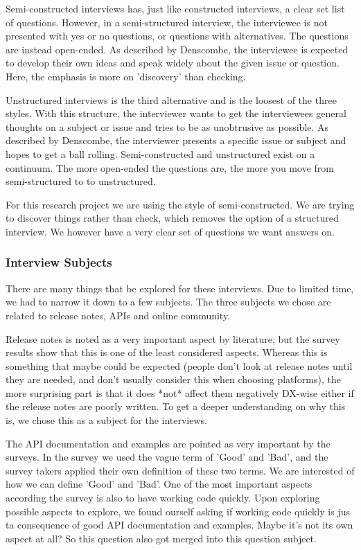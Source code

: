 \documentclass{article}
\begin{document}
Semi-constructed interviews has, just like constructed interviews, a clear set
list of questions. However, in a semi-structured interview, the interviewee
is not presented with yes or no questions, or questions with alternatives.
The questions are instead open-ended. As described by Denscombe, the interviewee
is expected to develop their own ideas and speak widely about the given issue or question.
Here, the emphasis is more on 'discovery' than checking.

Unstructured interviews is the third alternative and is the loosest of the three styles.
With this structure, the interviewer wants to get the interviewees general thoughts
on a subject or issue and tries to be as unobtrusive as possible. As described by Denscombe,
the interviewer presents a specific issue or subject and hopes to get a ball rolling.
Semi-constructed and unstructured exist on a continuum. The more open-ended the questions
are, the more you move from semi-structured to to unstructured.

For this research project we are using the style of semi-constructed.
We are trying to discover things rather than check, which removes the option
of a structured interview. We however have a very clear set of questions
we want answers on.

\subsubsection{Interview Subjects}
There are many things that be explored for these interviews. Due to limited
time, we had to narrow it down to a few subjects. The three subjects
we chose are related to release notes, APIs and online community.

Release notes is noted as a very important aspect by literature, but
the survey results show that this is one of the least considered aspects.
Whereas this is something that maybe could be expected (people don't look
at release notes until they are needed, and don't usually consider this
when choosing platforms), the more surprising part is that it does *not*
affect them negatively DX-wise either if the release notes are poorly written.
To get a deeper understanding on why this is, we chose this as a subject
for the interviews.

The API documentation and examples are pointed as very important by the
surveys. In the survey we used the vague term of 'Good' and 'Bad', and
the survey takers applied their own definition of these two terms. We
are interested of how we can define 'Good' and 'Bad'. One of the most important
aspects according the survey is also to have working code quickly. Upon exploring
possible aspects to explore, we found ourself asking if working code quickly
is jus ta consequence of good API documentation and examples. Maybe it's not
its own aspect at all? So this question also got merged into this question subject.
\end{document}
